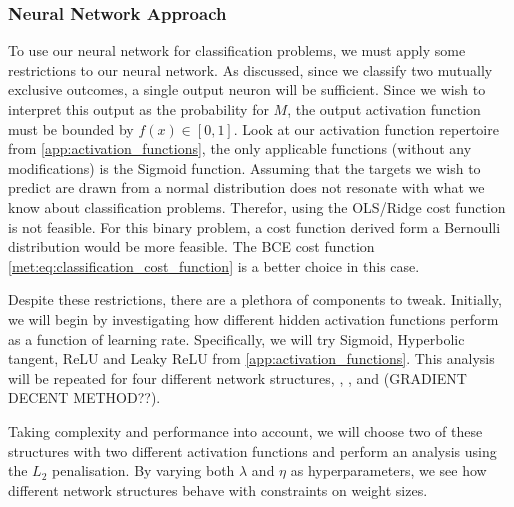     \subsubsection{Neural Network Approach}
    To use our neural network for classification problems, we must apply some restrictions to our neural network. As discussed, since we classify two mutually exclusive outcomes, a single output neuron will be sufficient. Since we wish to interpret this output as the probability for $M$, the output activation function must be bounded by $f(x) \in [0,1]$. Look at our activation function repertoire from \cref{app:activation_functions}, the only applicable functions (without any modifications) is the Sigmoid function. Assuming that the targets we wish to predict are drawn from a normal distribution does not resonate with what we know about classification problems. Therefor, using the OLS/Ridge cost function is not feasible. For this binary problem, a cost function derived form a Bernoulli distribution would be more feasible. The BCE cost function \cref{met:eq:classification_cost_function} is a better choice in this case.     
    
    Despite these restrictions, there are a plethora of components to tweak. Initially, we will begin by investigating how different hidden activation functions perform as a function of learning rate. Specifically, we will try Sigmoid, Hyperbolic tangent, ReLU and Leaky ReLU from \cref{app:activation_functions}. This analysis will be repeated for four different network structures, , ,  and   (GRADIENT DECENT METHOD??).

    Taking complexity and performance into account, we will choose two of these structures with two different activation functions and perform an analysis using the $L_2$ penalisation. By varying both $\lambda$ and $\eta$ as hyperparameters, we see how different network structures behave with constraints on weight sizes.  
